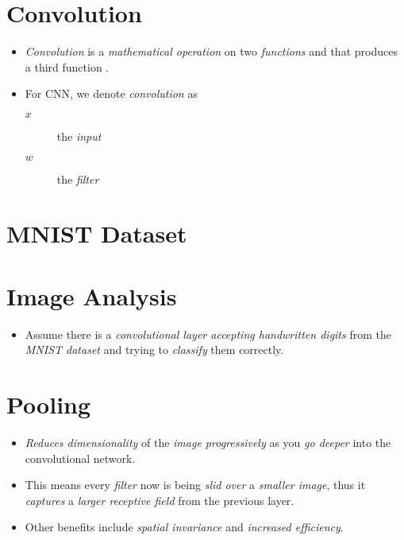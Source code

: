 \documentclass[
	number={9},
	title={Convolutional Neural Network}
]{cs584notes}
\begin{document}
\section{Convolution}\label{sec:convolution}
\begin{itemize}
	\item \emph{Convolution} is a \emph{mathematical operation} on two \emph{functions}  and  that produces a third function .
	\item For CNN, we denote \emph{convolution} as 
	\begin{description}
		\item[$x$] the \emph{input}
		\item[$w$] the \emph{filter}
	\end{description}
\end{itemize}

\section{MNIST Dataset}\label{sec:mnist-dataset}

\section{Image Analysis}\label{sec:image-analysis}
\begin{itemize}
	\item Assume there is a \emph{convolutional layer accepting handwritten digits} from the \emph{MNIST dataset} and trying to \emph{classify} them correctly.
\end{itemize}

\section{Pooling}\label{sec:pooling}
\begin{itemize}
	\item \emph{Reduces dimensionality} of the \emph{image progressively} as you \emph{go deeper} into the convolutional network.
	\item This means every \emph{filter} now is being \emph{slid over} a \emph{smaller image}, thus it \emph{captures} a \emph{larger receptive field} from the previous layer.
	\item Other benefits include \emph{spatial invariance} and \emph{increased efficiency}.
\end{itemize}
\end{document}
